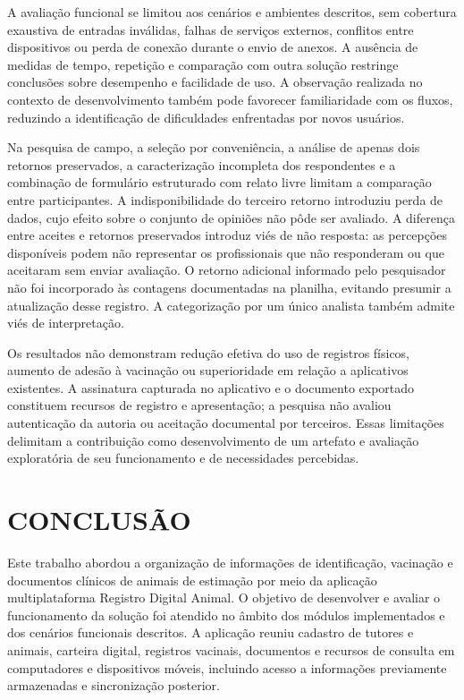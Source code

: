 \documentclass{UNESC}
\begin{document}
A avaliação funcional se limitou aos cenários e ambientes descritos, sem cobertura exaustiva de entradas inválidas, falhas de serviços externos, conflitos entre dispositivos ou perda de conexão durante o envio de anexos. A ausência de medidas de tempo, repetição e comparação com outra solução restringe conclusões sobre desempenho e facilidade de uso. A observação realizada no contexto de desenvolvimento também pode favorecer familiaridade com os fluxos, reduzindo a identificação de dificuldades enfrentadas por novos usuários.

Na pesquisa de campo, a seleção por conveniência, a análise de apenas dois retornos preservados, a caracterização incompleta dos respondentes e a combinação de formulário estruturado com relato livre limitam a comparação entre participantes. A indisponibilidade do terceiro retorno introduziu perda de dados, cujo efeito sobre o conjunto de opiniões não pôde ser avaliado. A diferença entre aceites e retornos preservados introduz viés de não resposta: as percepções disponíveis podem não representar os profissionais que não responderam ou que aceitaram sem enviar avaliação. O retorno adicional informado pelo pesquisador não foi incorporado às contagens documentadas na planilha, evitando presumir a atualização desse registro. A categorização por um único analista também admite viés de interpretação.

Os resultados não demonstram redução efetiva do uso de registros físicos, aumento de adesão à vacinação ou superioridade em relação a aplicativos existentes. A assinatura capturada no aplicativo e o documento exportado constituem recursos de registro e apresentação; a pesquisa não avaliou autenticação da autoria ou aceitação documental por terceiros. Essas limitações delimitam a contribuição como desenvolvimento de um artefato e avaliação exploratória de seu funcionamento e de necessidades percebidas.

\endgroup

\section{CONCLUSÃO}

Este trabalho abordou a organização de informações de identificação, vacinação e documentos clínicos de animais de estimação por meio da aplicação multiplataforma Registro Digital Animal. O objetivo de desenvolver e avaliar o funcionamento da solução foi atendido no âmbito dos módulos implementados e dos cenários funcionais descritos. A aplicação reuniu cadastro de tutores e animais, carteira digital, registros vacinais, documentos e recursos de consulta em computadores e dispositivos móveis, incluindo acesso a informações previamente armazenadas e sincronização posterior.
\end{document}
